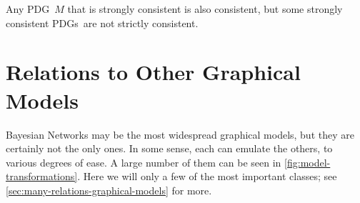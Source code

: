 \documentclass{article}
\newcommand{\MN}{PDG}
\newcommand{\MNs}{\MN s}
\begin{document}
	\begin{prop}
		Any \MN\ $M$ that is strongly consistent is also consistent, but some strongly consistent \MNs\ are not strictly consistent.
	\end{prop}

	
	

	\section{Relations to Other Graphical Models}\label{sec:other-graphical-models}
	
	Bayesian Networks may be the most widespread graphical models, but they are certainly not the only ones. In some sense, each can emulate the others, to various degrees of ease. A large number of them can be seen in \cref{fig:model-transformations}. Here we will only a few of the most important classes; see \cref{sec:many-relations-graphical-models} for more.
\end{document}
